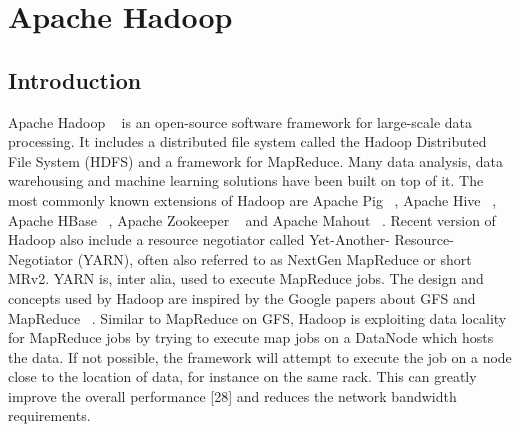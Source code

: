 
%
%
%


\chapter{Apache Hadoop}
\label{ch:hadoop}





\section{Introduction}

Apache Hadoop ~\cite{h17} is an open-source software framework for large-scale data
processing. It includes a distributed file system called the Hadoop Distributed
File System (HDFS) and a framework for MapReduce. Many data analysis,
data warehousing and machine learning solutions have been built on top of it.
The most commonly known extensions of Hadoop are Apache Pig ~\cite{21}, Apache
Hive ~\cite{22}, Apache HBase  ~\cite{26}, Apache Zookeeper  ~\cite{27} and Apache Mahout  ~\cite{23}.
Recent version of Hadoop also include a resource negotiator called Yet-Another-
Resource-Negotiator (YARN), often also referred to as NextGen MapReduce or
short MRv2. YARN is, inter alia, used to execute MapReduce jobs. The design
and concepts used by Hadoop are inspired by the Google papers about GFS and
MapReduce ~\cite[p.~9]{h17}. Similar to MapReduce on GFS, Hadoop is exploiting data
locality for MapReduce jobs by trying to execute map jobs on a DataNode which
hosts the data. If not possible, the framework will attempt to execute the job
on a node close to the location of data, for instance on the same rack. This can
greatly improve the overall performance [28] and reduces the network bandwidth
requirements.



